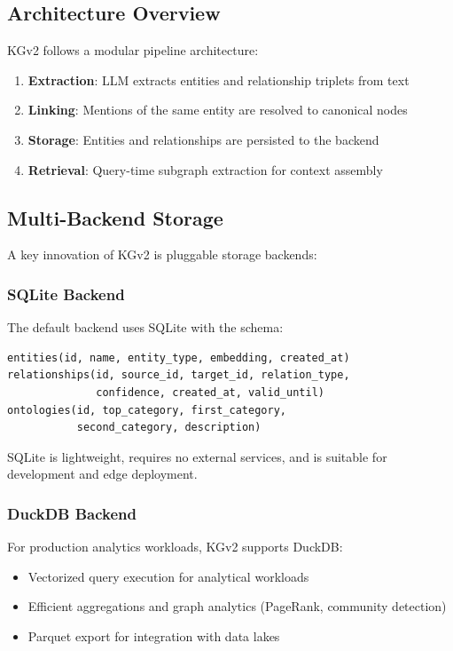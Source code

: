 \subsection{Architecture Overview}

KGv2 follows a modular pipeline architecture:

\begin{enumerate}
    \item \textbf{Extraction}: LLM extracts entities and relationship triplets from text
    \item \textbf{Linking}: Mentions of the same entity are resolved to canonical nodes
    \item \textbf{Storage}: Entities and relationships are persisted to the backend
    \item \textbf{Retrieval}: Query-time subgraph extraction for context assembly
\end{enumerate}

\subsection{Multi-Backend Storage}

A key innovation of KGv2 is pluggable storage backends:

\subsubsection{SQLite Backend}

The default backend uses SQLite with the schema:

\begin{verbatim}
entities(id, name, entity_type, embedding, created_at)
relationships(id, source_id, target_id, relation_type, 
              confidence, created_at, valid_until)
ontologies(id, top_category, first_category, 
           second_category, description)
\end{verbatim}

SQLite is lightweight, requires no external services, and is suitable for development and edge deployment.

\subsubsection{DuckDB Backend}

For production analytics workloads, KGv2 supports DuckDB:

\begin{itemize}
    \item Vectorized query execution for analytical workloads
    \item Efficient aggregations and graph analytics (PageRank, community detection)
    \item Parquet export for integration with data lakes
\end{itemize}


